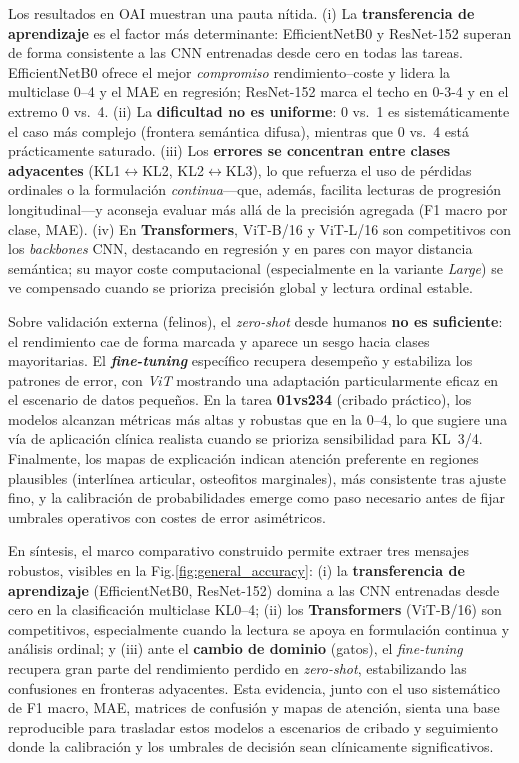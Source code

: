 \documentclass[11pt,spanish,listoffigures,listoftables]{tfgetsinf}
\begin{document}
Los resultados en OAI muestran una pauta nítida. (i) La \textbf{transferencia de aprendizaje} es el factor más determinante: EfficientNetB0 y ResNet-152 superan de forma consistente a las CNN entrenadas desde cero en todas las tareas. EfficientNetB0 ofrece el mejor \emph{compromiso} rendimiento–coste y lidera la multiclase 0--4 y el MAE en regresión; ResNet-152 marca el techo en 0-3-4 y en el extremo 0 vs.\ 4. (ii) La \textbf{dificultad no es uniforme}: 0 vs.\ 1 es sistemáticamente el caso más complejo (frontera semántica difusa), mientras que 0 vs.\ 4 está prácticamente saturado. (iii) Los \textbf{errores se concentran entre clases adyacentes} (KL1$\leftrightarrow$KL2, KL2$\leftrightarrow$KL3), lo que refuerza el uso de pérdidas ordinales o la formulación \emph{continua}—que, además, facilita lecturas de progresión longitudinal—y aconseja evaluar más allá de la precisión agregada (F1 macro por clase, MAE). (iv) En \textbf{Transformers}, ViT-B/16 y ViT-L/16 son competitivos con los \emph{backbones} CNN, destacando en regresión y en pares con mayor distancia semántica; su mayor coste computacional (especialmente en la variante \emph{Large}) se ve compensado cuando se prioriza precisión global y lectura ordinal estable.

Sobre validación externa (felinos), el \emph{zero-shot} desde humanos \textbf{no es suficiente}: el rendimiento cae de forma marcada y aparece un sesgo hacia clases mayoritarias. El \textbf{\emph{fine-tuning}} específico recupera desempeño y estabiliza los patrones de error, con \emph{ViT} mostrando una adaptación particularmente eficaz en el escenario de datos pequeños. En la tarea \textbf{01vs234} (cribado práctico), los modelos alcanzan métricas más altas y robustas que en la 0--4, lo que sugiere una vía de aplicación clínica realista cuando se prioriza sensibilidad para KL~3/4. Finalmente, los mapas de explicación indican atención preferente en regiones plausibles (interlínea articular, osteofitos marginales), más consistente tras ajuste fino, y la calibración de probabilidades emerge como paso necesario antes de fijar umbrales operativos con costes de error asimétricos.

En síntesis, el marco comparativo construido permite extraer tres mensajes robustos, visibles en la Fig.\ref{fig:general_accuracy}: (i) la \textbf{transferencia de aprendizaje} (EfficientNetB0, ResNet-152) domina a las CNN entrenadas desde cero en la clasificación multiclase KL0--4; (ii) los \textbf{Transformers} (ViT-B/16) son competitivos, especialmente cuando la lectura se apoya en formulación continua y análisis ordinal; y (iii) ante el \textbf{cambio de dominio} (gatos), el \emph{fine-tuning} recupera gran parte del rendimiento perdido en \emph{zero-shot}, estabilizando las confusiones en fronteras adyacentes. Esta evidencia, junto con el uso sistemático de F1 macro, MAE, matrices de confusión y mapas de atención, sienta una base reproducible para trasladar estos modelos a escenarios de cribado y seguimiento donde la calibración y los umbrales de decisión sean clínicamente significativos.
\end{document}
